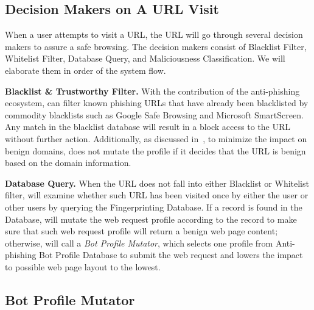 \subsection{Decision Makers on A URL Visit}

When a user attempts to visit a URL, the URL will go through several decision makers to assure a safe browsing.
The decision makers consist of Blacklist Filter, Whitelist Filter, Database Query, and Maliciousness Classification.
We will elaborate them in order of the system flow.

\noindent
\textbf{Blacklist \& Trustworthy Filter.}
With the contribution of the anti-phishing ecosystem, \spartacus can filter known phishing URLs that have already been blacklisted by commodity blacklists such as Google Safe Browsing and Microsoft SmartScreen.
Any match in the blacklist database will result in a block access to the URL without further action.
Additionally, as discussed in~, to minimize the impact on benign domains, \spartacus does not mutate the profile if it decides that the URL is benign based on the domain information.


\noindent
\textbf{Database Query.}
When the URL does not fall into either Blacklist or Whitelist filter, \spartacus will examine whether such URL has been visited once by either the user or other users by querying the Fingerprinting Database.
If a record is found in the Database, \spartacus will mutate the web request profile according to the record to make sure that such web request profile will return a benign web page content;
otherwise, \spartacus will call a \emph{Bot Profile Mutator}, which selects one profile from Anti-phishing Bot Profile Database to submit the web request and lowers the impact to possible web page layout to the lowest.



\subsection{Bot Profile Mutator}

